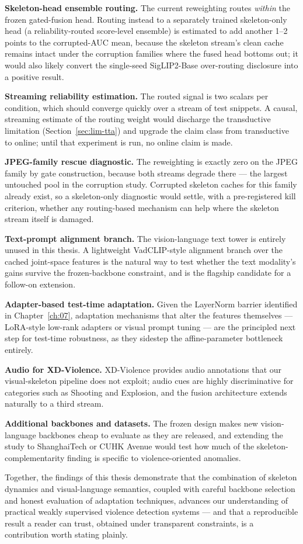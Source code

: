 \textbf{Skeleton-head ensemble routing.} The current reweighting routes
\emph{within} the frozen gated-fusion head. Routing instead to a separately
trained skeleton-only head (a reliability-routed score-level ensemble) is
estimated to add another 1--2 points to the corrupted-AUC mean, because the
skeleton stream's clean cache remains intact under the corruption families
where the fused head bottoms out; it would also likely convert the single-seed
SigLIP2-Base over-routing disclosure into a positive result.

\textbf{Streaming reliability estimation.} The routed signal is two scalars
per condition, which should converge quickly over a stream of test snippets. A
causal, streaming estimate of the routing weight would discharge the
transductive limitation (Section~\ref{sec:lim-tta}) and upgrade the claim class from transductive to
online; until that experiment is run, no online claim is made.

\textbf{JPEG-family rescue diagnostic.} The reweighting is exactly zero on the
JPEG family by gate construction, because both streams degrade there --- the
largest untouched pool in the corruption study. Corrupted skeleton caches for
this family already exist, so a skeleton-only diagnostic would settle, with a
pre-registered kill criterion, whether any routing-based mechanism can help
where the skeleton stream itself is damaged.

\textbf{Text-prompt alignment branch.} The vision-language text tower is
entirely unused in this thesis. A lightweight VadCLIP-style alignment branch
over the cached joint-space features is the natural way to test whether the
text modality's gains survive the frozen-backbone constraint, and is the
flagship candidate for a follow-on extension.

\textbf{Adapter-based test-time adaptation.} Given the LayerNorm barrier
identified in Chapter~\ref{ch:07}, adaptation mechanisms that alter the
features themselves --- LoRA-style low-rank adapters or visual prompt tuning
--- are the principled next step for test-time robustness, as they sidestep
the affine-parameter bottleneck entirely.

\textbf{Audio for XD-Violence.} XD-Violence provides audio annotations that
our visual-skeleton pipeline does not exploit; audio cues are highly
discriminative for categories such as Shooting and Explosion, and the fusion
architecture extends naturally to a third stream.

\textbf{Additional backbones and datasets.} The frozen design makes new
vision-language backbones cheap to evaluate as they are released, and
extending the study to ShanghaiTech or CUHK Avenue would test how much of the
skeleton-complementarity finding is specific to violence-oriented anomalies.

\bigskip

Together, the findings of this thesis demonstrate that the combination of skeleton dynamics
and visual-language semantics, coupled with careful backbone selection and
honest evaluation of adaptation techniques, advances our understanding of
practical weakly supervised violence detection systems --- and that a
reproducible result a reader can trust, obtained under transparent
constraints, is a contribution worth stating plainly.
